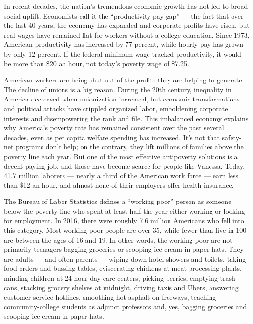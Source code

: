 In recent decades, the nation's tremendous economic growth has not led
to broad social uplift. Economists call it the ``productivity-pay gap''
--- the fact that over the last 40 years, the economy has expanded and
corporate profits have risen, but real wages have remained flat for
workers without a college education. Since 1973, American productivity
has increased by 77 percent, while hourly pay has grown by only 12
percent. If the federal minimum wage tracked productivity, it would be
more than \$20 an hour, not today's poverty wage of \$7.25.

American workers are being shut out of the profits they are helping to
generate. The decline of unions is a big reason. During the 20th
century, inequality in America decreased when unionization increased,
but economic transformations and political attacks have crippled
organized labor, emboldening corporate interests and disempowering the
rank and file. This imbalanced economy explains why America's poverty
rate has remained consistent over the past several decades, even as per
capita welfare spending has increased. It's not that safety-net programs
don't help; on the contrary, they lift millions of families above the
poverty line each year. But one of the most effective antipoverty
solutions is a decent-paying job, and those have become scarce for
people like Vanessa. Today, 41.7 million laborers --- nearly a third of
the American work force --- earn less than \$12 an hour, and almost none
of their employers offer health insurance.

The Bureau of Labor Statistics defines a ``working poor'' person as
someone below the poverty line who spent at least half the year either
working or looking for employment. In 2016, there were roughly 7.6
million Americans who fell into this category. Most working poor people
are over 35, while fewer than five in 100 are between the ages of 16 and
19. In other words, the working poor are not primarily teenagers bagging
groceries or scooping ice cream in paper hats. They are adults --- and
often parents --- wiping down hotel showers and toilets, taking food
orders and bussing tables, eviscerating chickens at meat-processing
plants, minding children at 24-hour day care centers, picking berries,
emptying trash cans, stacking grocery shelves at midnight, driving taxis
and Ubers, answering customer-service hotlines, smoothing hot asphalt on
freeways, teaching community-college students as adjunct professors and,
yes, bagging groceries and scooping ice cream in paper hats.

